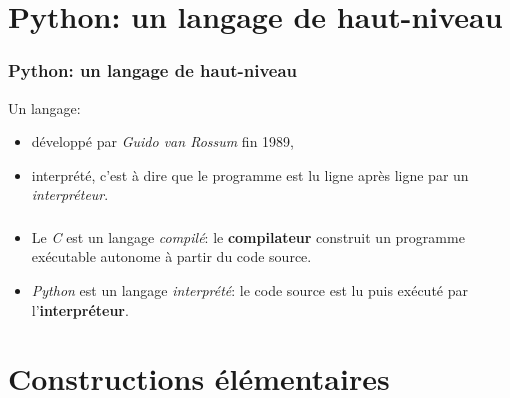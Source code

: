 \documentclass[svgnames,11pt]{beamer}
\begin{document}
\section{Python: un langage de haut-niveau}
\begin{frame}
    \frametitle{Python: un langage de haut-niveau}
    Un langage:
    \begin{itemize}
        \item<1-> développé par \emph{Guido van Rossum} fin 1989,
        \item<2-> interprété, c'est à dire que le programme est lu ligne après ligne par un \emph{interpréteur}.
    \end{itemize}

\end{frame}
\begin{frame}
    \frametitle{}

    \begin{aretenir}[]
        \begin{itemize}
            \item Le \emph{C} est un langage \emph{compilé}: le \textbf{compilateur} construit un programme exécutable autonome à partir du code source.
            \item \emph{Python} est un langage \emph{interprété}: le code source est lu puis exécuté par l'\textbf{interpréteur}.
        \end{itemize}
    \end{aretenir}

\end{frame}
\section{Constructions élémentaires}
\end{document}
